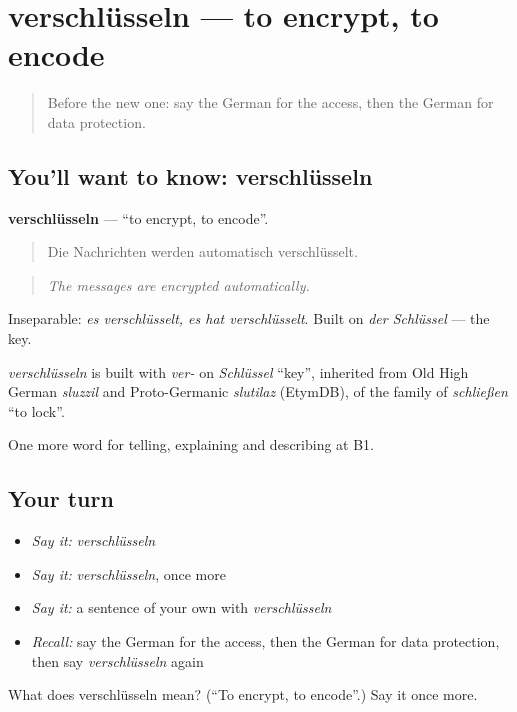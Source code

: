 \section[verschlüsseln]{verschlüsseln — to encrypt, to encode}

\label{lesson:GE-C395-verschluesseln}



\begin{quote}
Before the new one: say the German for the access, then the German for data protection.
\end{quote}

\subsection*{You'll want to know: verschlüsseln}
\textbf{verschlüsseln} — \textquotedblleft{}to encrypt, to encode\textquotedblright{}.

\begin{quote}
Die Nachrichten werden automatisch verschlüsselt.
\end{quote}

\begin{quote}
\emph{The messages are encrypted automatically.}
\end{quote}

Inseparable: \emph{es verschlüsselt, es hat verschlüsselt}. Built on \emph{der Schlüssel} — the key.

\begin{cousinweb}
\emph{verschlüsseln} is built with \emph{ver-} on \emph{Schlüssel} \textquotedblleft{}key\textquotedblright{}, inherited from Old High German \emph{sluzzil} and Proto-Germanic \emph{slutilaz} (EtymDB), of the family of \emph{schließen} \textquotedblleft{}to lock\textquotedblright{}.
\end{cousinweb}

\begin{grammarlens}[title={What you've built}]
One more word for telling, explaining and describing at B1.
\end{grammarlens}

\subsection*{Your turn}
\begin{itemize}
\raggedright
  \item \emph{Say it:} \emph{verschlüsseln}
  \item \emph{Say it:} \emph{verschlüsseln}, once more
  \item \emph{Say it:} a sentence of your own with \emph{verschlüsseln}
  \item \emph{Recall:} say the German for the access, then the German for data protection, then say \emph{verschlüsseln} again
\end{itemize}

\begin{tcolorbox}[breakable,colback=teal!4,colframe=teal!35!black,title={Before you move on}]
What does verschlüsseln mean? (\textquotedblleft{}To encrypt, to encode\textquotedblright{}.) Say it once more.
\end{tcolorbox}
